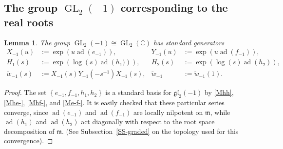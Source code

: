 \documentclass[11pt,letterpaper]{amsart}
\newcounter{thecounter}
\numberwithin{thecounter}{section}
\newtheorem{lemma}[thecounter]{Lemma}
\theoremstyle{definition}
\DeclareMathOperator{\GL}{GL}
\DeclareMathOperator{\ad}{ad}
\newcommand{\C}{{\mathbb C}}
\newcommand{\m}{{\mathfrak{m}}}
\begin{document}

\subsection{The group $\GL_2(-1)$ corresponding to the real roots}\label{SS-gl2re}

\begin{lemma} The group $\GL_2(-1) \cong \GL_2(\C)$ has standard generators
\begin{align*}
X_{-1}(u) &:= \exp\left({u} \ad\left(e_{-1} \right) \right),&
Y_{-1}(u) &:= \exp\left({u} \ad\left(f_{-1} \right) \right),\\
{H}_1(s) &:= \exp\left(\log(s)\ad\left({h}_1) \right) \right),&
{H}_2(s) &:= \exp\left(\log(s)\ad\left({h}_2 \right) \right),\\
\widetilde{w}_{-1}(s) &:=X_{-1}(s)Y_{-1}(-s^{-1})X_{-1}(s),& \widetilde{w}_{-1} &:= \widetilde{w}_{-1}(1).
\end{align*}

\end{lemma}
\begin{proof}
The set $\left\{e_{-1},f_{-1},h_1,h_2\right\}$ is a
standard basis for $\mathfrak{gl}_2(-1)$ by \eqref{Mhh}, \eqref{Mhe-}, \eqref{Mhf-}, and \eqref{Me-f-}.
It is easily checked that these particular series converge, since $\ad(e_{-1})$ and $\ad(f_{-1})$ are locally nilpotent on $\m$, while $\ad(h_{1})$ and $\ad(h_{2})$ act  diagonally with respect to the root space decomposition of $\m$.
(See Subsection~\ref{SS-graded} on the topology used for this convergence). 
 \end{proof}
\end{document}
